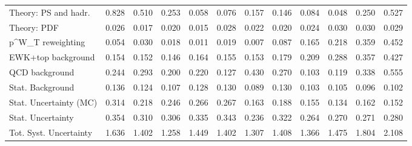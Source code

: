 \begin{tabular}{l|p{0.6cm}p{0.6cm}p{0.6cm}p{0.6cm}p{0.6cm}p{0.6cm}p{0.6cm}p{0.6cm}p{0.6cm}p{0.6cm}p{0.6cm}}
Theory: PS and hadr.                     & 0.828 & 0.510 & 0.253 & 0.058 & 0.076 & 0.157 & 0.146 & 0.084 & 0.048 & 0.250 & 0.527 \\
Theory: PDF                              & 0.026 & 0.017 & 0.020 & 0.015 & 0.028 & 0.022 & 0.020 & 0.024 & 0.030 & 0.030 & 0.029 \\
p^{W}_{T} reweighting                    & 0.054 & 0.030 & 0.018 & 0.011 & 0.019 & 0.007 & 0.087 & 0.165 & 0.218 & 0.359 & 0.452 \\
EWK+top background                       & 0.154 & 0.152 & 0.146 & 0.164 & 0.155 & 0.153 & 0.179 & 0.209 & 0.288 & 0.357 & 0.427 \\
QCD background                           & 0.244 & 0.293 & 0.200 & 0.220 & 0.127 & 0.430 & 0.270 & 0.103 & 0.119 & 0.338 & 0.555 \\
Stat. Background                         & 0.136 & 0.124 & 0.107 & 0.128 & 0.130 & 0.089 & 0.130 & 0.103 & 0.105 & 0.096 & 0.102 \\
Stat. Uncertainty (MC)                   & 0.314 & 0.218 & 0.246 & 0.266 & 0.267 & 0.163 & 0.188 & 0.155 & 0.134 & 0.162 & 0.152 \\
\hline
Stat. Uncertainty                        & 0.354 & 0.310 & 0.306 & 0.335 & 0.343 & 0.236 & 0.322 & 0.264 & 0.270 & 0.271 & 0.280 \\
\hline
Tot. Syst. Uncertainty                   & 1.636 & 1.402 & 1.258 & 1.449 & 1.402 & 1.307 & 1.408 & 1.366 & 1.475 & 1.804 & 2.108 \\
\hline
\end{tabular}
